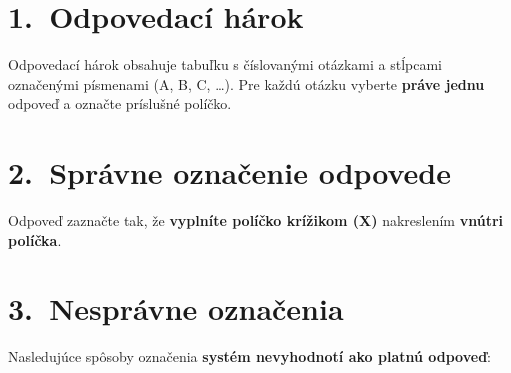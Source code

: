 \documentclass[10pt]{article}
\newcommand{\exEmptyBox}[2]{%
    \draw[gray, thick] (#1,#2) rectangle ++(0.45,0.45);
}
\newcommand{\exCrossBox}[2]{%
    \draw[gray, thick] (#1,#2) rectangle ++(0.45,0.45);
    \draw[thick] (#1+0.04,#2+0.04) -- (#1+0.41,#2+0.41);
    \draw[thick] (#1+0.04,#2+0.41) -- (#1+0.41,#2+0.04);
}
\begin{document}
\section*{\small 1.\ Odpovedací hárok}
\vspace{-4pt}
{\small Odpovedací hárok obsahuje tabuľku s číslovanými otázkami a stĺpcami označenými písmenami (A, B, C, \ldots).
Pre každú otázku vyberte \textbf{práve jednu} odpoveď a označte príslušné políčko.}

\vspace{2pt}

\section*{\small 2.\ Správne označenie odpovede}
\vspace{-4pt}
{\small Odpoveď zaznačte tak, že \textbf{vyplníte políčko krížikom (X)} nakreslením \textbf{vnútri políčka}.}

\vspace{4pt}

\begin{center}
\end{center}

\vspace{2pt}

\section*{\small 3.\ Nesprávne označenia}
\vspace{-4pt}
{\small Nasledujúce spôsoby označenia \textbf{systém nevyhodnotí ako platnú odpoveď}:}

\vspace{4pt}
\end{document}
